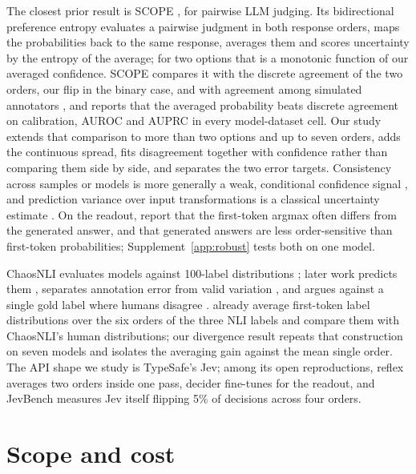\documentclass[10pt,twocolumn]{article}
\begin{document}
The closest prior result is SCOPE \citep{scope2026}, for pairwise LLM judging. Its bidirectional preference entropy evaluates a pairwise judgment in both response orders, maps the probabilities back to the same response, averages them and scores uncertainty by the entropy of the average; for two options that is a monotonic function of our averaged confidence. SCOPE compares it with the discrete agreement of the two orders, our flip in the binary case, and with agreement among simulated annotators \citep{jung2024trust}, and reports that the averaged probability beats discrete agreement on calibration, AUROC and AUPRC in every model-dataset cell. Our study extends that comparison to more than two options and up to seven orders, adds the continuous spread, fits disagreement together with confidence rather than comparing them side by side, and separates the two error targets. Consistency across samples or models is more generally a weak, conditional confidence signal \citep{ding2026agree}, and prediction variance over input transformations is a classical uncertainty estimate \citep{ayhan2018tta,wang2019tta}. On the readout, \citet{wang2024myanswer} report that the first-token argmax often differs from the generated answer, and \citet{wang2024lookatthetext} that generated answers are less order-sensitive than first-token probabilities; Supplement~\ref{app:robust} tests both on one model.

ChaosNLI evaluates models against 100-label distributions \citep{nie2020chaosnli}; later work predicts them \citep{zhou2022distributed}, separates annotation error from valid variation \citep{webergenzel2024varierr}, and argues against a single gold label where humans disagree \citep{plank2022problem}. \citet{chen2024seeing} already average first-token label distributions over the six orders of the three NLI labels and compare them with ChaosNLI's human distributions; our divergence result repeats that construction on seven models and isolates the averaging gain against the mean single order. The API shape we study is TypeSafe's Jev; among its open reproductions, reflex \citep{reflex2026} averages two orders inside one pass, decider \citep{decider2026} fine-tunes for the readout, and JevBench \citep{jevbench2026} measures Jev itself flipping 5\% of decisions across four orders.

\section{Scope and cost}
\end{document}
